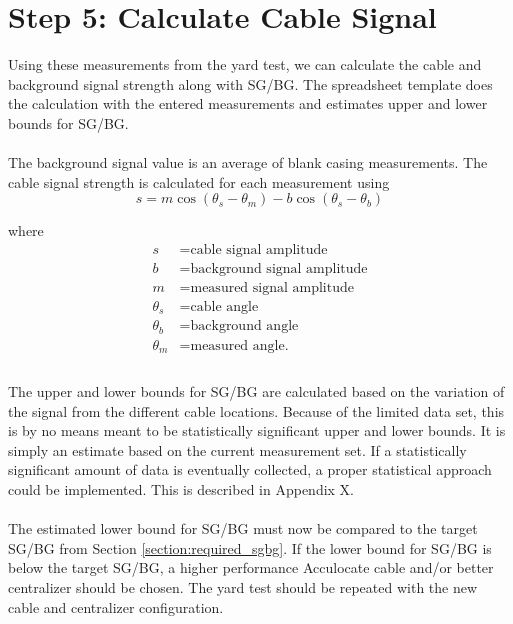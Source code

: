 \documentclass[paper=a4, fontsize=11pt]{scrartcl}
\numberwithin{equation}{section}		%
\numberwithin{figure}{section}			%
\numberwithin{table}{section}				%
\begin{document}
\section{Step 5: Calculate Cable Signal}\label{section:step_5}
Using these measurements from the yard test, we can calculate the cable and background signal strength along with SG/BG.  The spreadsheet template does the calculation with the entered measurements and estimates upper and lower bounds for SG/BG. 

\paragraph{}
The background signal value is an average of blank casing measurements.  The cable signal strength is calculated for each measurement using
\begin{equation}
    s = m \cos\left(\theta_s-\theta_m\right) - b\cos\left( \theta_s-\theta_b\right)
\end{equation}

where 
\begin{align*}
    s &= \text{cable signal amplitude}\\
    b &= \text{background signal amplitude}\\
    m &= \text{measured signal amplitude}\\
    \theta_s &= \text{cable angle}\\
    \theta_b &= \text{background angle}\\
    \theta_m &= \text{measured angle.}\\
\end{align*}

\paragraph{}
The upper and lower bounds for SG/BG are calculated based on the variation of the signal from the different cable locations.  Because of the limited data set, this is by no means meant to be statistically significant upper and lower bounds.  It is simply an estimate based on the current measurement set.  If a statistically significant amount of data is eventually collected, a proper statistical approach could be implemented.  This is described in Appendix X.

\paragraph{}
The estimated lower bound for SG/BG must now be compared to the target SG/BG from Section \ref{section:required_sgbg}.  If the lower bound for SG/BG is below the target SG/BG, a higher performance Acculocate cable and/or better centralizer should be chosen.  The yard test should be repeated with the new cable and centralizer configuration. 
\end{document}
